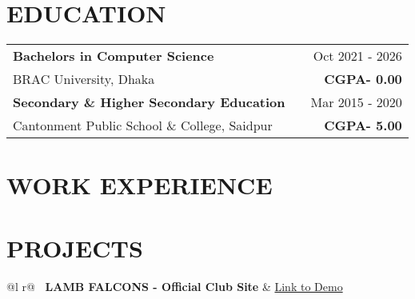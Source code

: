 \documentclass[a4paper,12pt]{article}
\begin{document}
\section{EDUCATION}
\begin{tabularx}{\linewidth}{@{}l X r@{}}
\textbf{Bachelors in Computer Science} & \hfill & Oct 2021 - 2026 \\
BRAC University, Dhaka & \hfill & \textbf{CGPA- 0.00} \\[15pt] 
\textbf{Secondary \& Higher Secondary Education} & \hfill & Mar 2015 - 2020 \\
Cantonment Public School \& College, Saidpur & \hfill & \textbf{CGPA- 5.00} \\
\end{tabularx}





\section{WORK EXPERIENCE}





    





  
\section{PROJECTS}

\begin{tabularx}{\linewidth}{ @{}l r@{} }
\textbf{\textbullet\ LAMB FALCONS - Official Club Site} & \hfill \href{https://lamb-falcons.vercel.app/}{Link to Demo} \\[3.75pt]
  \\
\end{tabularx}
\end{document}
